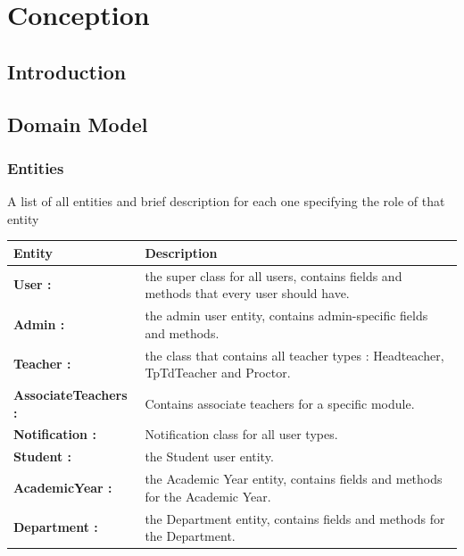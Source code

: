 \documentclass[]{uc2pfecaneva}
\begin{document}
    \setlength{\parskip}{6pt}
    \tableofcontents
    \listoffigures
    \listoftables
    \chapter{Conception}
    \newpage

    \raggedright\section{Introduction}
    \raggedright\section{Domain Model}

    \begin{table}
        \raggedright\subsection{Entities}
        A list of all entities and brief description for each one specifying the role of that entity\linebreak \\
        \begin{tabularx}{\textwidth}{|l|X|}
            \hline
            Entity          & Description                                                                                                                                                                \\ \hline
            \textbf{User :} & the super class for all users, contains fields and methods that every user should have.\\ \hline
            \textbf{Admin :} & the admin user entity, contains admin-specific fields and methods.\\ \hline
            \textbf{Teacher :} & the class that contains all teacher types : Headteacher, TpTdTeacher and Proctor.\\ \hline
            \textbf{AssociateTeachers :} & Contains associate teachers for a specific module.\\ \hline
            \textbf{Notification :} & Notification class for all user types.\\ \hline
            \textbf{Student :} & the Student user entity.\\ \hline
            \textbf{AcademicYear :} & the Academic Year entity, contains fields and methods for the Academic Year.\\ \hline
            \textbf{Department :} & the Department entity, contains fields and methods for the Department.\\ \hline

\end{tabularx}
\end{table}
\end{document}
